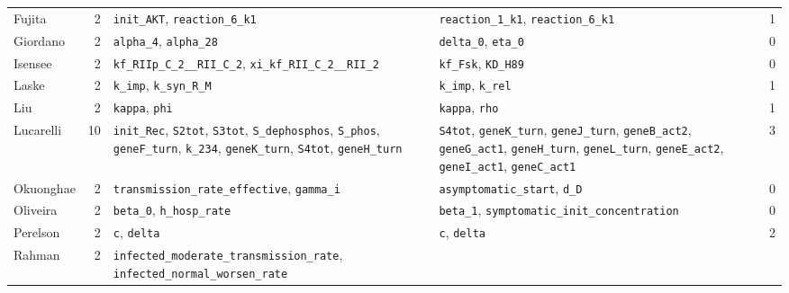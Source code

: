 {\begin{longtable}{@{}>{\raggedright\arraybackslash}p{2.3cm}r>{\raggedright\arraybackslash}p{4.0cm}>{\raggedright\arraybackslash}p{4.0cm}c@{}}
Fujita & 2
  & \texttt{init\_\allowbreak{}AKT}, \texttt{reaction\_\allowbreak{}6\_\allowbreak{}k1}
  & \texttt{reaction\_\allowbreak{}1\_\allowbreak{}k1}, \texttt{reaction\_\allowbreak{}6\_\allowbreak{}k1}
  & 1 \\
Giordano & 2
  & \texttt{alpha\_\allowbreak{}4}, \texttt{alpha\_\allowbreak{}28}
  & \texttt{delta\_\allowbreak{}0}, \texttt{eta\_\allowbreak{}0}
  & 0 \\
Isensee & 2
  & \texttt{kf\_\allowbreak{}RIIp\_\allowbreak{}C\_\allowbreak{}2\_\allowbreak{}\_\allowbreak{}RII\_\allowbreak{}C\_\allowbreak{}2}, \texttt{xi\_\allowbreak{}kf\_\allowbreak{}RII\_\allowbreak{}C\_\allowbreak{}2\_\allowbreak{}\_\allowbreak{}RII\_\allowbreak{}2}
  & \texttt{kf\_\allowbreak{}Fsk}, \texttt{KD\_\allowbreak{}H89}
  & 0 \\
Laske & 2
  & \texttt{k\_\allowbreak{}imp}, \texttt{k\_\allowbreak{}syn\_\allowbreak{}R\_\allowbreak{}M}
  & \texttt{k\_\allowbreak{}imp}, \texttt{k\_\allowbreak{}rel}
  & 1 \\
Liu & 2
  & \texttt{kappa}, \texttt{phi}
  & \texttt{kappa}, \texttt{rho}
  & 1 \\
Lucarelli & 10
  & \texttt{init\_\allowbreak{}Rec}, \texttt{S2tot}, \texttt{S3tot}, \texttt{S\_\allowbreak{}dephosphos}, \texttt{S\_\allowbreak{}phos}, \texttt{geneF\_\allowbreak{}turn}, \texttt{k\_\allowbreak{}234}, \texttt{geneK\_\allowbreak{}turn}, \texttt{S4tot}, \texttt{geneH\_\allowbreak{}turn}
  & \texttt{S4tot}, \texttt{geneK\_\allowbreak{}turn}, \texttt{geneJ\_\allowbreak{}turn}, \texttt{geneB\_\allowbreak{}act2}, \texttt{geneG\_\allowbreak{}act1}, \texttt{geneH\_\allowbreak{}turn}, \texttt{geneL\_\allowbreak{}turn}, \texttt{geneE\_\allowbreak{}act2}, \texttt{geneI\_\allowbreak{}act1}, \texttt{geneC\_\allowbreak{}act1}
  & 3 \\
Okuonghae & 2
  & \texttt{transmission\_\allowbreak{}rate\_\allowbreak{}effective}, \texttt{gamma\_\allowbreak{}i}
  & \texttt{asymptomatic\_\allowbreak{}start}, \texttt{d\_\allowbreak{}D}
  & 0 \\
Oliveira & 2
  & \texttt{beta\_\allowbreak{}0}, \texttt{h\_\allowbreak{}hosp\_\allowbreak{}rate}
  & \texttt{beta\_\allowbreak{}1}, \texttt{symptomatic\_\allowbreak{}init\_\allowbreak{}concentration}
  & 0 \\
Perelson & 2
  & \texttt{c}, \texttt{delta}
  & \texttt{c}, \texttt{delta}
  & 2 \\
Rahman & 2
  & \texttt{infected\_\allowbreak{}moderate\_\allowbreak{}transmission\_\allowbreak{}rate}, \texttt{infected\_\allowbreak{}normal\_\allowbreak{}worsen\_\allowbreak{}rate}

\end{longtable}}
